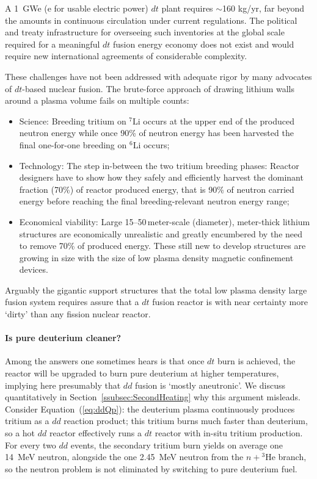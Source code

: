 \documentclass[particles,article,accept,pdftex,moreauthors]{Definitions/mdpi}
\newcommand{\req}[1]{Equation~(\ref{#1})}
\newcommand{\rsec}[1]{Section~\ref{#1}}
\begin{document}
A 1~GWe (e for usable electric power) $dt$ plant requires $\sim$160 kg/yr, far beyond the amounts in continuous circulation under current regulations. The political and treaty infrastructure for overseeing such inventories at the global scale required for a meaningful $dt$ fusion energy economy does not exist and would require new international agreements of considerable complexity.

These challenges have not been addressed with adequate rigor by many advocates of $dt$-based nuclear fusion. The brute-force approach of drawing lithium walls around a plasma volume fails on multiple counts:
\begin{itemize}
\item Science: Breeding tritium on ${}^7\mathrm{Li}$ occurs at the upper end of the produced neutron energy while once 90\% of neutron energy has been harvested the final one-for-one breeding on ${}^6\mathrm{Li}$ occurs;
\item Technology: The step in-between the two tritium breeding phases: Reactor designers have to show how they safely and efficiently harvest the dominant fraction (70\%) of reactor produced energy, that is 90\% of neutron carried energy before reaching the final breeding-relevant neutron energy range; 
\item Economical viability: Large 15--50\,meter-scale (diameter), meter-thick lithium structures are economically unrealistic and greatly encumbered by the need to remove 70\% of produced energy. These still new to develop structures are growing in size with the size of low plasma density magnetic confinement devices. 
\end{itemize}
Arguably the gigantic support structures that the total low plasma density large fusion system requires assure that a $dt$ fusion reactor is with near certainty more `dirty' than any fission nuclear reactor.

\paragraph*{\bf Is pure deuterium cleaner?}
Among the answers one sometimes hears is that once $dt$ burn is achieved, the reactor will be upgraded to burn pure deuterium at higher temperatures, implying here presumably that $dd$ fusion is `mostly aneutronic'. We discuss quantitatively in \rsec{ssubsec:SecondHeating} why this argument misleads. Consider \req{eq:ddQp}: the deuterium plasma continuously produces tritium as a $dd$ reaction product; this tritium burns much faster than deuterium, so a hot $dd$ reactor effectively runs a $dt$ reactor with in-situ tritium production. For every two $dd$ events, the secondary tritium burn yields on average one 14~MeV neutron, alongside the one 2.45~MeV neutron from the $n+{}^3\mathrm{He}$ branch, so the neutron problem is not eliminated by switching to pure deuterium fuel.
\end{document}
